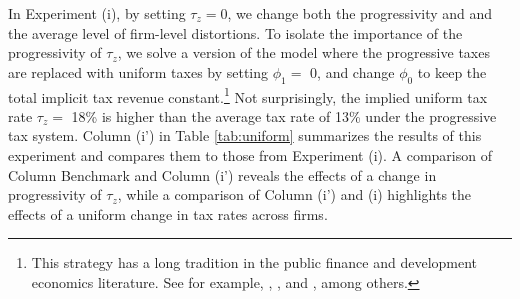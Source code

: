 \documentclass[AEJ]{AEA}
\begin{document}
In Experiment (i), by setting $\tau_z = 0$, we change both the progressivity and and the average level of firm-level distortions. To isolate the importance of the progressivity of $\tau_z$, we solve a version of the model where the progressive taxes are replaced with uniform taxes by setting $\phi_1 =$ 0, and change $\phi_0$ to keep the total implicit tax revenue constant.\footnote{This strategy has a long tradition in the public finance and development economics literature. See for example, \citet{Ventura:1999}, \citet{ConesaKrueger:2006}, \citet{Bhattacharyaetal:2013} and \citet{BentoRestuccia:2016}, among others.} Not surprisingly, the implied uniform tax rate $\tau_z =$ 18\% is higher than the average tax rate of 13\% under the progressive tax system. Column (i') in Table \ref{tab:uniform} summarizes the results of this experiment and compares them to those from Experiment (i). A comparison of Column Benchmark and Column (i') reveals the effects of a change in progressivity of $\tau_z$, while a comparison of Column (i') and (i) highlights the effects of a uniform change in tax rates across firms.
\end{document}
